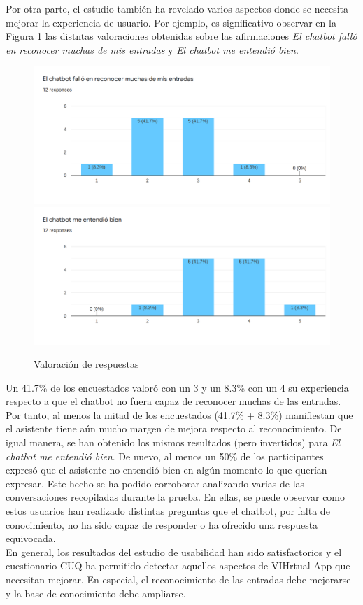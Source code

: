 Por otra parte, el estudio también ha revelado varios aspectos donde se necesita mejorar la experiencia de usuario. Por ejemplo, es significativo observar en la Figura \ref{fig:encuesta2} las distntas valoraciones obtenidas sobre las afirmaciones \textit{El chatbot falló en reconocer muchas de mis entradas} y \textit{El chatbot me entendió bien}.\\
 
 
\begin{figure}[htbp]
\centering
\includegraphics[scale=0.3]{../images/pregunta2.png}
\includegraphics[scale=0.3]{../images/pregunta3.png}
\caption{Valoración de respuestas}
\label{fig:encuesta2}
\end{figure}

Un 41.7\% de los encuestados valoró con un 3 y un 8.3\% con un 4 su experiencia respecto a que el chatbot 	no fuera capaz de reconocer muchas de las entradas. Por tanto, al menos la mitad de los encuestados (41.7\% + 8.3\%) manifiestan que el asistente tiene aún mucho margen de mejora respecto al reconocimiento. De igual manera, se han obtenido los mismos resultados (pero invertidos) para \textit{El chatbot me entendió bien}. De nuevo, al menos un 50\% de los participantes expresó que el asistente no entendió bien en algún momento lo que querían expresar. Este hecho se ha podido corroborar analizando varias de las conversaciones recopiladas durante la prueba. En ellas, se puede observar como estos usuarios han realizado distintas preguntas que el chatbot, por falta de conocimiento, no ha sido capaz de responder o ha ofrecido una respuesta equivocada.\\



En general, los resultados del estudio de usabilidad han sido satisfactorios y el cuestionario CUQ ha permitido detectar aquellos aspectos de VIHrtual-App que necesitan mejorar. En especial, el reconocimiento de las entradas debe mejorarse y la base de conocimiento debe ampliarse.\\


